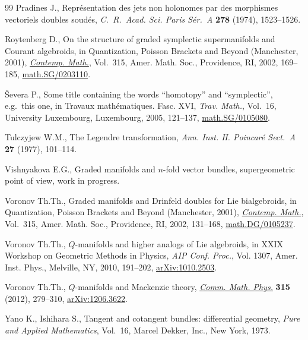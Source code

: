 \begin{thebibliography}{99}
Pradines J., Repr\'esentation des jets non holonomes par des morphismes
  vectoriels doubles soud\'es, \textit{C.~R.~Acad. Sci. Paris S\'er.~A}
  \textbf{278} (1974), 1523--1526.

Roytenberg D., On the structure of graded symplectic supermanifolds and
  {C}ourant algebroids, in Quantization, {P}oisson Brackets and Beyond
  ({M}anchester, 2001), \href{http://dx.doi.org/10.1090/conm/315/05479}{\textit{Contemp. Math.}}, Vol.~315, Amer. Math. Soc.,
  Providence, RI, 2002, 169--185, \href{http://arxiv.org/abs/math.SG/0203110}{math.SG/0203110}.

{\v{S}}evera P., Some title containing the words ``homotopy'' and
  ``symplectic'', e.g.\ this one, in Travaux math\'ematiques. {F}asc. {XVI},
  \textit{Trav. Math.}, Vol.~16, University Luxembourg, Luxembourg, 2005,
  121--137, \href{http://arxiv.org/abs/math.SG/0105080}{math.SG/0105080}.

Tulczyjew W.M., The {L}egendre transformation, \textit{Ann. Inst. H. Poincar\'e
  Sect.~A} \textbf{27} (1977), 101--114.

Vishnyakova E.G., Graded manifolds and $n$-fold vector bundles, supergeometric
  point of view, work in progress.

Voronov Th.Th., Graded manifolds and {D}rinfeld doubles for {L}ie bialgebroids,
  in Quantization, {P}oisson Brackets and Beyond ({M}anchester, 2001),
  \href{http://dx.doi.org/10.1090/conm/315/05478}{\textit{Contemp. Math.}}, Vol.~315, Amer. Math. Soc., Providence, RI, 2002,
  131--168, \href{http://arxiv.org/abs/math.DG/0105237}{math.DG/0105237}.

Voronov Th.Th., {$Q$}-manifolds and higher analogs of {L}ie algebroids, in X{XIX}
  {W}orkshop on {G}eometric {M}e\-thods in {P}hysics, \textit{AIP Conf. Proc.},
  Vol. 1307, Amer. Inst. Phys., Melville, NY, 2010, 191--202,
  \href{http://arxiv.org/abs/1010.2503}{arXiv:1010.2503}.

Voronov Th.Th., {$Q$}-manifolds and {M}ackenzie theory, \href{http://dx.doi.org/10.1007/s00220-012-1568-y}{\textit{Comm. Math.
  Phys.}} \textbf{315} (2012), 279--310, \href{http://arxiv.org/abs/1206.3622}{arXiv:1206.3622}.

Yano K., Ishihara S., Tangent and cotangent bundles: dif\/ferential geometry,
  \textit{Pure and Applied Mathematics}, Vol.~16, Marcel Dekker, Inc., New
  York, 1973.

\end{thebibliography}
